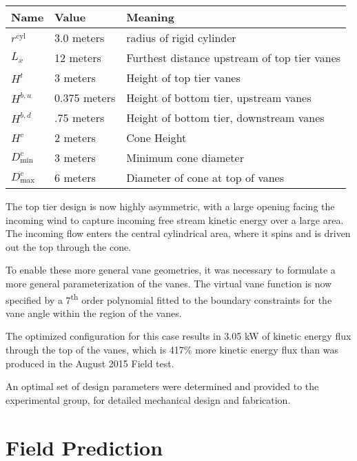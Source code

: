 \begin{table}[]
\centering
\begin{tabular}{lll}
Name                        & Value & Meaning                    \\
 \hline
$r^{\text{cyl}}$            &  3.0 meters  & radius of rigid cylinder \\
$L_x$                       &  12 meters  & Furthest distance upstream of top	 tier vanes \\
 $H^t    $                  &   3 meters  & Height of top tier vanes \\
 $H^{b,u}$                  & 0.375 meters & Height of bottom tier, upstream vanes \\
 $H^{b,d}$                  &   .75 meters& Height of bottom tier, downstream vanes \\
 $H^{c}$                    &   2 meters  & Cone Height \\
 $D^c_{\text{min}}    $     &   3 meters  & Minimum cone diameter \\
 $D^c_{\text{max}}    $     &   6 meters  & Diameter of cone at top of vanes\\
\end{tabular}
\end{table}


The top tier design is now highly asymmetric, with a
large opening facing the incoming wind to capture incoming free stream
kinetic energy over a large area. The incoming flow enters the central
cylindrical area, where it spins and is driven out the top through the
cone. 

To enable these more general vane geometries, it was necessary to
formulate a more general parameterization of the vanes. The virtual vane 
function is now specified by a 7\textsuperscript{th} order polynomial
fitted to the boundary constraints for the vane angle within the region
of the vanes.

The optimized configuration for this case results in 3.05 kW of kinetic
energy flux through the top of the vanes, which is 417\% more kinetic
energy flux than was produced in the August 2015 Field test.

An optimal set of design parameters were determined and provided to the
experimental group, for detailed mechanical design and
fabrication.



\section{Field Prediction}
\label{subsec:field_predict}

